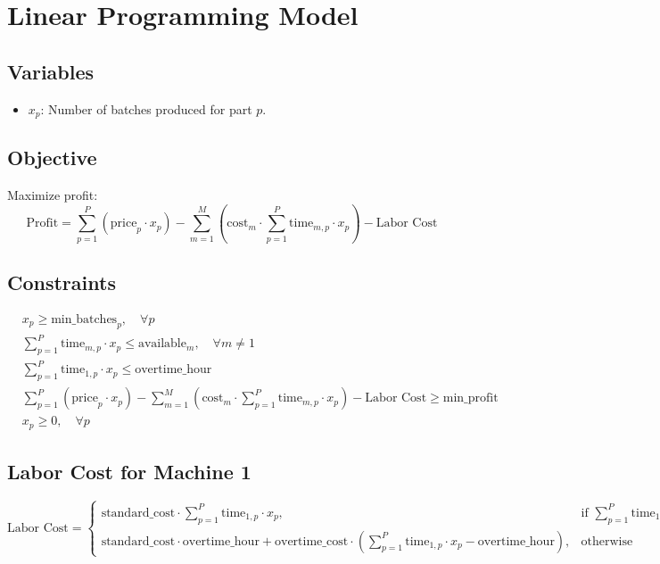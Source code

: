 \documentclass{article}
\begin{document}
\section*{Linear Programming Model}

\subsection*{Variables}
\begin{itemize}
    \item \( x_p \): Number of batches produced for part \( p \).
\end{itemize}

\subsection*{Objective}
Maximize profit:
\[
\text{Profit} = \sum_{p=1}^{P} (\text{price}_p \cdot x_p) - \sum_{m=1}^{M} \left(\text{cost}_m \cdot \sum_{p=1}^{P} \text{time}_{m,p} \cdot x_p \right) - \text{Labor Cost}
\]

\subsection*{Constraints}
\begin{align}
    & x_p \geq \text{min_batches}_p, \quad \forall p \\
    & \sum_{p=1}^{P} \text{time}_{m,p} \cdot x_p \leq \text{available}_m, \quad \forall m \neq 1 \\
    & \sum_{p=1}^{P} \text{time}_{1,p} \cdot x_p \leq \text{overtime_hour} \\
    & \sum_{p=1}^{P} (\text{price}_p \cdot x_p) - \sum_{m=1}^{M} \left(\text{cost}_m \cdot \sum_{p=1}^{P} \text{time}_{m,p} \cdot x_p \right) - \text{Labor Cost} \geq \text{min_profit} \\
    & x_p \geq 0, \quad \forall p
\end{align}

\subsection*{Labor Cost for Machine 1}
\[
\text{Labor Cost} = 
\begin{cases} 
\text{standard\_cost} \cdot \sum_{p=1}^{P} \text{time}_{1,p} \cdot x_p, & \text{if } \sum_{p=1}^{P} \text{time}_{1,p} \cdot x_p \leq \text{overtime_hour} \\
\text{standard\_cost} \cdot \text{overtime_hour} + \text{overtime_cost} \cdot \left(\sum_{p=1}^{P} \text{time}_{1,p} \cdot x_p - \text{overtime_hour}\right), & \text{otherwise}
\end{cases}
\]
\end{document}
